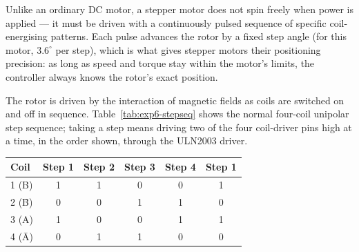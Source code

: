 \begin{introduction}
  Unlike an ordinary DC motor, a stepper motor does not spin freely when power is applied --- it must be driven with a continuously pulsed sequence of specific coil-energising patterns. Each pulse advances the rotor by a fixed step angle (for this motor, $3.6^\circ$ per step), which is what gives stepper motors their positioning precision: as long as speed and torque stay within the motor's limits, the controller always knows the rotor's exact position.
  \vspace*{1.5em}

  The rotor is driven by the interaction of magnetic fields as coils are switched on and off in sequence. Table~\ref{tab:exp6-stepseq} shows the normal four-coil unipolar step sequence; taking a step means driving two of the four coil-driver pins high at a time, in the order shown, through the ULN2003 driver.
\end{introduction}

\needspace{4cm}
\begin{boxedtable}
  \label{tab:exp6-stepseq}
  {\renewcommand{\arraystretch}{1.5}
    \centering
    \begin{tabular}{lccccc}
      \toprule
      Coil    & Step 1 & Step 2 & Step 3 & Step 4 & Step 1 \\
      \midrule
      1 (B)   & 1      & 1      & 0      & 0      & 1      \\
      2 (\=B) & 0      & 0      & 1      & 1      & 0      \\
      3 (A)   & 1      & 0      & 0      & 1      & 1      \\
      4 (\=A) & 0      & 1      & 1      & 0      & 0      \\
      \bottomrule
    \end{tabular}
  }
\end{boxedtable}


